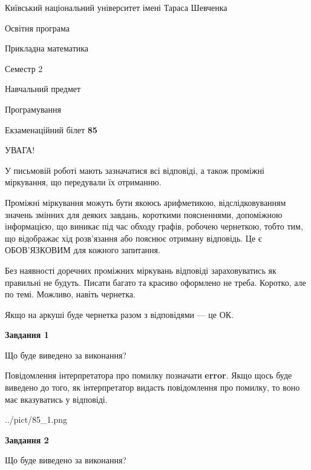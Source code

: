 \documentclass[12pt, ukrainian]{article}
\begin{document}
{{\begin {small}\par
{ \center  Київський національний університет імені Тараса Шевченка \par}
{\parbox {5 cm}{Освітня програма \hfill}{\parbox {7 cm}{Прикладна математика \hfill}}\parbox {6 cm}{\hfill Семестр 2}}\par
{\parbox {5 cm} {Навчальний предмет \hfill}\parbox {7 cm}{Програмування \hfill}\parbox {6cm}{\hfill}\par}\vspace{-7pt} \end{small}}{\center Екзаменаційний білет \No \textbf
{ 85 }\par}}
{
\begin {large}
УВАГА!

У письмовій роботі мають зазначатися всі відповіді, а також проміжні міркування, що передували їх отриманню.

Проміжні міркування можуть бути якоюсь арифметикою, відслідковуванням зна\-чень змінних для деяких завдань,
короткими поясненнями, допоміжною інформацією, що виникає під час обходу графів, робочею чернеткою,
тобто тим, що відображає хід розв’язання або пояснює отриману відповідь.
Це є ОБОВ’ЯЗКОВИМ для кожного запитання.

Без наявності доречних проміжних міркувань відповіді зараховуватись як правиль\-ні не будуть.
Писати багато та красиво оформлено не треба. Коротко, але по темі. Можли\-во, навіть чернетка.

Якщо на аркуші буде чернетка разом з відповідями --- це ОК.

\newpage

{\begin {center}\textbf{Завдання 1}\end {center}}\par
Що буде виведено за виконання?

Повідомлення інтерпретатора про помилку позначати \textbf{error}.
Якщо щось буде виведено до того, як інтерпретатор видасть повідомлення про помилку, 
то воно має вказуватись у відповіді. \par


\begin{center}
	{../pict/85_1.png}
\end{center}
\newpage

{\begin {center}\textbf{Завдання 2}\end {center}}\par
Що буде виведено за виконання?


\end{large}}
\end{document}
